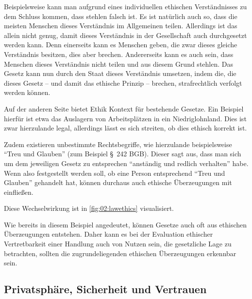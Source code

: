 Beispielsweise kann man aufgrund eines individuellen ethischen Verständnisses zu dem Schluss kommen, dass stehlen falsch ist.
Es ist natürlich auch so, dass die meisten Menschen dieses Verständnis im Allgemeinen teilen.
Allerdings ist das allein nicht genug, damit dieses Verständnis in der Gesellschaft auch durchgesetzt werden kann.
Denn einerseits kann es Menschen geben, die zwar dieses gleiche Verständnis besitzen, dies aber brechen.
Andererseits kann es auch sein, dass Menschen dieses Verständnis nicht teilen und aus diesem Grund stehlen.
Das Gesetz kann nun durch den Staat dieses Verständnis umsetzen, indem die,
die dieses Gesetz -- und damit das ethische Prinzip -- brechen, strafrechtlich verfolgt werden können.

Auf der anderen Seite bietet Ethik Kontext für bestehende Gesetze.
Ein Beispiel hierfür ist etwa das Auslagern von Arbeitsplätzen in ein Niedriglohnland.
Dies ist zwar hierzulande legal, allerdings lässt es sich streiten, ob dies ethisch korrekt ist.

Zudem existieren unbestimmte Rechtsbegriffe, wie hierzulande beispielsweise \enquote{Treu und Glauben} (zum Beispiel §~242 BGB).
Dieser sagt aus, dass man sich um dem jeweiligen Gesetz zu entsprechen \enquote{anständig und redlich verhalten} habe. \cite{alexy_treu_2019}
Wenn also festgestellt werden soll, ob eine Person entsprechend \enquote{Treu und Glauben} gehandelt hat,
können durchaus auch ethische Überzeugungen mit einfließen.

Diese Wechselwirkung ist in \cref{fig:02:lawethics} visualisiert.

Wie bereits in diesem Beispiel angedeutet, können Gesetze auch oft aus ethischen Überzeugungen entstehen.
Daher kann es bei der Evaluation ethischer Vertretbarkeit einer Handlung auch von Nutzen sein,
die gesetzliche Lage zu betrachten, sollten die zugrundeliegenden ethischen Überzeugungen erkennbar sein.

\subsection{Privatsphäre, Sicherheit und Vertrauen}

